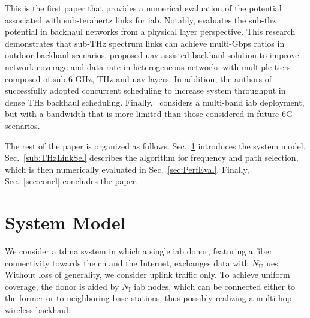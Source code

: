 This is the first paper that provides a numerical evaluation of the potential associated with sub-terahertz links for \gls{iab}. Notably, \cite{9135258} evaluates the sub-\gls{thz} potential in backhaul networks from a physical layer perspective. This research demonstrates that sub-THz spectrum links can achieve multi-Gbps ratios in outdoor backhaul scenarios. \cite{9163026} proposed \gls{uav}-assisted backhaul solution to improve network coverage and data rate in heterogeneous networks with multiple tiers composed of sub-6 GHz, THz and \gls{uav} layers. In addition, the authors of \cite{9136652} successfully adopted concurrent scheduling to increase system throughput in dense THz backhaul scheduling. Finally,~\cite{saha2018integrated} considers a multi-band \gls{iab} deployment, but with a bandwidth that is more limited than those considered in future 6G scenarios. 

The rest of the paper is organized as follows. Sec.~\ref{sec:system} introduces the system model. Sec.~\ref{sub:THzLinkSel} describes the algorithm for frequency and path selection, which is then numerically evaluated in Sec.~\ref{sec:PerfEval}. Finally, Sec.~\ref{sec:concl} concludes the paper. 


\section{System Model}
\label{sec:system}

\begin{comment} %
We consider an \gls{iab} \gls{tdma} system in which a single \gls{iab} donor, featuring a fiber connectivity towards the \gls{cn} and the Internet, provides wireless backahuling functionality to $N_{\mathrm{I}}$ \gls{iab} nodes. On the access side, $N_{\mathrm{U}}$ \glspl{ue} %
exchange data with the \gls{iab} donor. %
The IAB nodes can be either connected to the latter, or to neighboring base stations thus possibly realizing a multi-hop wireless backhaul. 
\end{comment}

We consider a \gls{tdma} system in which a single \gls{iab} donor, featuring a fiber connectivity towards the \gls{cn} and the Internet, exchanges data with $N_{\mathrm{U}}$ \glspl{ue}. Without loss of generality, we consider uplink traffic only.
To achieve uniform coverage, the donor is aided by $N_{\mathrm{I}}$ \gls{iab} nodes, which can be connected either to the former or to neighboring base stations, thus possibly realizing a multi-hop wireless backhaul. 

